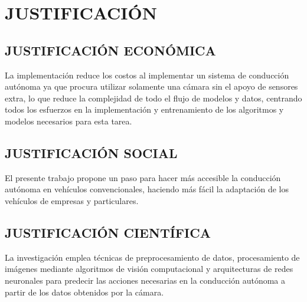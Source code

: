 \section{JUSTIFICACIÓN}
    \subsection{JUSTIFICACIÓN ECONÓMICA}
    La implementación reduce los costos al implementar un sistema de conducción autónoma ya que procura utilizar solamente una cámara sin el apoyo de sensores extra, lo que reduce la complejidad de todo el flujo de modelos y datos, centrando todos los esfuerzos en la implementación y entrenamiento de los algoritmos y modelos necesarios para esta tarea.
    \subsection{JUSTIFICACIÓN SOCIAL}
    El presente trabajo propone un paso para hacer más accesible la conducción autónoma en vehículos convencionales, haciendo más fácil la adaptación de los vehículos de empresas y particulares.
    \subsection{JUSTIFICACIÓN CIENTÍFICA}
    La investigación emplea técnicas de preprocesamiento de datos, procesamiento de imágenes mediante algoritmos de visión computacional y arquitecturas de redes neuronales para predecir las acciones necesarias en la conducción autónoma a partir de los datos obtenidos por la cámara.